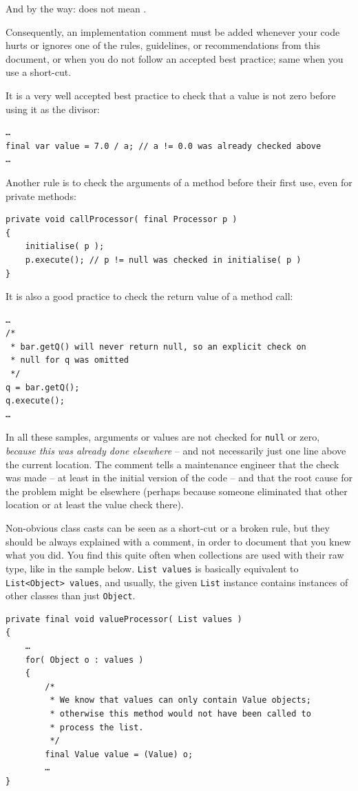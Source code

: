 And by the way:  does not mean .

Consequently, an implementation comment must be added whenever your code hurts or ignores one of the rules, guidelines, or recommendations from this document, or when you do not follow an accepted best practice; same when you use a short-cut.

It is a very well accepted best practice to check that a value is not zero before using it as the divisor:
\begin{lstlisting}
…
final var value = 7.0 / a; // a != 0.0 was already checked above
…
\end{lstlisting}

Another rule is to check the arguments of a method before their first use, even for private methods:
\begin{lstlisting}
private void callProcessor( final Processor p )
{
    initialise( p );
    p.execute(); // p != null was checked in initialise( p )
}
\end{lstlisting}

It is also a good practice to check the return value of a method call:
\begin{lstlisting}
…
/*
 * bar.getQ() will never return null, so an explicit check on
 * null for q was omitted
 */
q = bar.getQ();
q.execute();
…
\end{lstlisting}

In all these samples, arguments or values are not checked for \lstinline|null| or zero, \textit{because this was already done elsewhere} – and not necessarily just one line above the current location. The comment tells a maintenance engineer that the check was made – at least in the initial version of the code – and that the root cause for the problem might be elsewhere (perhaps because someone eliminated that other location or at least the value check there).

Non-obvious class casts can be seen as a short-cut or a broken rule, but they should be always explained with a comment, in order to document that you knew what you did. You find this quite often when collections are used with their raw type, like in the sample below. \lstinline|List values| is basically equivalent to \lstinline|List<Object> values|, and usually, the given \lstinline|List| instance contains instances of other classes than just \lstinline|Object|.
\begin{lstlisting}
private final void valueProcessor( List values )
{
    …
    for( Object o : values )
    {
        /*
         * We know that values can only contain Value objects;
         * otherwise this method would not have been called to
         * process the list.
         */
        final Value value = (Value) o;
        …
}
\end{lstlisting}

